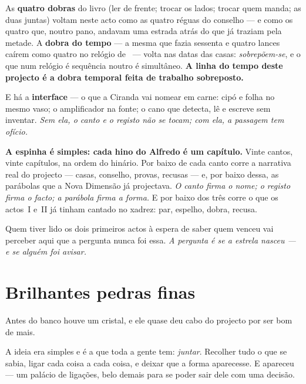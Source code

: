 \documentclass[livro.tex]{subfiles}
\begin{document}
\medskip
\noindent As \textbf{quatro dobras} do livro (ler de frente; trocar os lados; trocar quem manda;
as duas juntas) voltam neste acto como as quatro réguas do conselho --- e como os quatro que,
noutro pano, andavam uma estrada atrás do que já traziam pela metade. A \textbf{dobra do tempo}
--- a mesma que fazia sessenta e quatro lances caírem como quatro no relógio de \Ven\ --- volta
nas datas das casas: \emph{sobrepõem-se}, e o que num relógio é sequência noutro é simultâneo.
\textbf{A linha do tempo deste projecto é a dobra temporal feita de trabalho sobreposto.}

\medskip
\noindent E há a \textbf{interface} --- o que a Ciranda vai nomear em carne: cipó e folha no
mesmo vaso; o amplificador na fonte; o cano que detecta, lê e escreve sem inventar. \emph{Sem
ela, o canto e o registo não se tocam; com ela, a passagem tem ofício.}

\medskip
\noindent \textbf{A espinha é simples: cada hino do Alfredo é um capítulo.}
Vinte cantos, vinte capítulos, na ordem do hinário. Por baixo de cada canto corre a
narrativa real do projecto --- casas, conselho, provas, recusas --- e, por baixo dessa, as
parábolas que a Nova Dimensão já projectava. \emph{O canto firma o nome; o registo firma o
facto; a parábola firma a forma.} E por baixo dos três corre o que os actos~I e~II já tinham
cantado no xadrez: par, espelho, dobra, recusa.

\medskip
\noindent Quem tiver lido os dois primeiros actos à espera de saber quem venceu vai perceber aqui
que a pergunta nunca foi essa. \emph{A pergunta é se a estrela nasceu --- e se alguém foi
avisar.}

\chapter{Brilhantes pedras finas}

Antes do banco houve um cristal, e ele quase deu cabo do projecto por ser bom de mais.

\medskip

A ideia era simples e é a que toda a gente tem: \emph{juntar}. Recolher tudo o que se sabia,
ligar cada coisa a cada coisa, e deixar que a forma aparecesse. E apareceu --- um palácio de
ligações, belo demais para se poder sair dele com uma decisão.

\medskip
\end{document}
